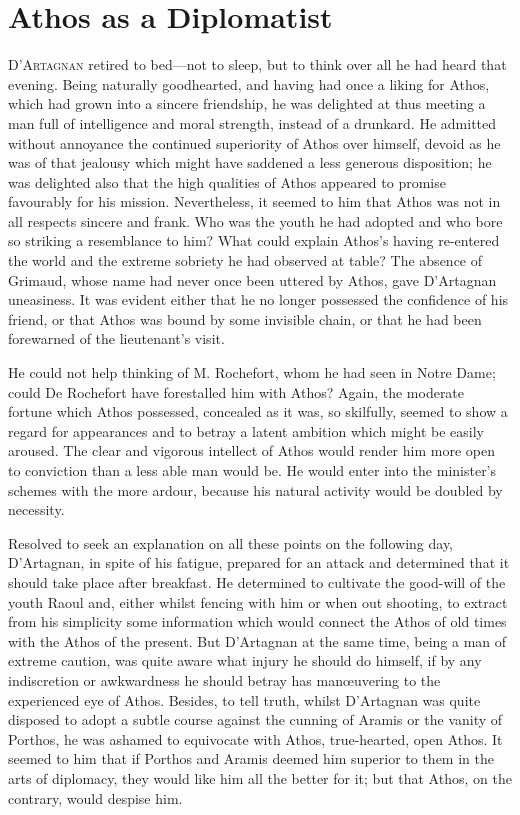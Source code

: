 \chapter{Athos as a Diplomatist}

 \lettrine{D}{'Artagnan} retired to bed—not to sleep, but to think over all he had heard that evening. Being naturally goodhearted, and having had once a liking for Athos, which had grown into a sincere friendship, he was delighted at thus meeting a man full of intelligence and moral strength, instead of a drunkard. He admitted without annoyance the continued superiority of Athos over himself, devoid as he was of that jealousy which might have saddened a less generous disposition; he was delighted also that the high qualities of Athos appeared to promise favourably for his mission. Nevertheless, it seemed to him that Athos was not in all respects sincere and frank. Who was the youth he had adopted and who bore so striking a resemblance to him? What could explain Athos's having re-entered the world and the extreme sobriety he had observed at table? The absence of Grimaud, whose name had never once been uttered by Athos, gave D'Artagnan uneasiness. It was evident either that he no longer possessed the confidence of his friend, or that Athos was bound by some invisible chain, or that he had been forewarned of the lieutenant's visit.

He could not help thinking of M. Rochefort, whom he had seen in Notre Dame; could De Rochefort have forestalled him with Athos? Again, the moderate fortune which Athos possessed, concealed as it was, so skilfully, seemed to show a regard for appearances and to betray a latent ambition which might be easily aroused. The clear and vigorous intellect of Athos would render him more open to conviction than a less able man would be. He would enter into the minister's schemes with the more ardour, because his natural activity would be doubled by necessity.

Resolved to seek an explanation on all these points on the following day, D'Artagnan, in spite of his fatigue, prepared for an attack and determined that it should take place after breakfast. He determined to cultivate the good-will of the youth Raoul and, either whilst fencing with him or when out shooting, to extract from his simplicity some information which would connect the Athos of old times with the Athos of the present. But D'Artagnan at the same time, being a man of extreme caution, was quite aware what injury he should do himself, if by any indiscretion or awkwardness he should betray has manœuvering to the experienced eye of Athos. Besides, to tell truth, whilst D'Artagnan was quite disposed to adopt a subtle course against the cunning of Aramis or the vanity of Porthos, he was ashamed to equivocate with Athos, true-hearted, open Athos. It seemed to him that if Porthos and Aramis deemed him superior to them in the arts of diplomacy, they would like him all the better for it; but that Athos, on the contrary, would despise him.

